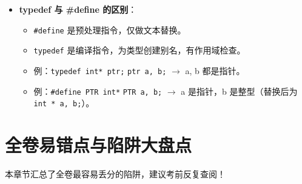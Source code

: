 \documentclass[a4paper,12pt]{article}
\begin{document}
\begin{itemize}
    \item \textbf{typedef 与 \#define 的区别}：
    \begin{itemize}
        \item \texttt{\#define} 是预处理指令，仅做文本替换。
        \item \texttt{typedef} 是编译指令，为类型创建别名，有作用域检查。
        \item 例：\texttt{typedef int* ptr;} \texttt{ptr a, b;} $\rightarrow$ a, b 都是指针。
        \item 例：\texttt{\#define PTR int*} \texttt{PTR a, b;} $\rightarrow$ a 是指针，b 是整型（替换后为 \texttt{int * a, b;}）。
    \end{itemize}
\end{itemize}

\section{全卷易错点与陷阱大盘点}
\label{sec:common_mistakes}

本章节汇总了全卷最容易丢分的陷阱，建议考前反复查阅！
\end{document}
